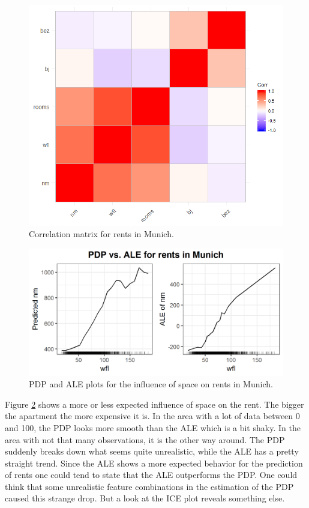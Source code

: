 \documentclass[
]{krantz}
\begin{document}
\begin{figure}
\includegraphics[width=1\linewidth]{images/ale_1_correlation_munich_rents} \caption{Correlation matrix for rents in Munich.}\label{fig:correlationMatrixRents}
\end{figure}



\begin{figure}
\includegraphics[width=1\linewidth]{images/ale_1_rf_rent_for_rooms_and_wfl} \caption{PDP and ALE plots for the influence of space on rents in Munich.}\label{fig:pdpaleRents}
\end{figure}



Figure \ref{fig:pdpaleRents} shows a more or less expected influence of space on the rent. The bigger the apartment the more expensive it is. In the area with a lot of data between 0 and 100, the PDP looks more smooth than the ALE which is a bit shaky. In the area with not that many observations, it is the other way around. The PDP suddenly breaks down what seems quite unrealistic, while the ALE has a pretty straight trend. Since the ALE shows a more expected behavior for the prediction of rents one could tend to state that the ALE outperforms the PDP. One could think that some unrealistic feature combinations in the estimation of the PDP caused this strange drop. But a look at the ICE plot reveals something else.
\end{document}
